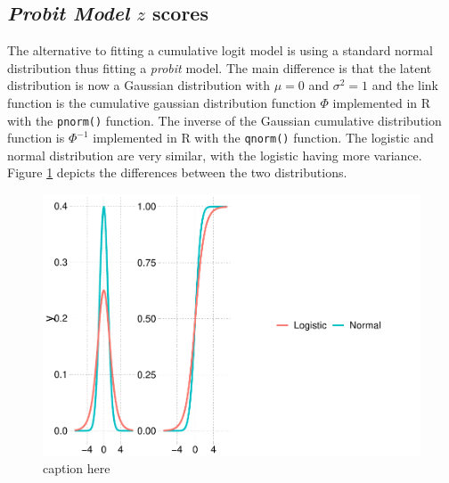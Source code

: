 \documentclass[
  man,floatsintext]{apa6}
\begin{document}
\subsection{\texorpdfstring{\emph{Probit Model} \(z\) scores}{Probit Model z scores}}\label{probit-model-z-scores}

The alternative to fitting a cumulative logit model is using a standard normal distribution thus fitting a \emph{probit} model. The main difference is that the latent distribution is now a Gaussian distribution with \(\mu = 0\) and \(\sigma^2 = 1\) and the link function is the cumulative gaussian distribution function \(\Phi\) implemented in R with the \texttt{pnorm()} function. The inverse of the Gaussian cumulative distribution function is \(\Phi^{-1}\) implemented in R with the \texttt{qnorm()} function. The logistic and normal distribution are very similar, with the logistic having more variance. Figure \ref{fig:fig-logit-vs-probit} depicts the differences between the two distributions.

\scriptsize

\begin{figure}

{\centering \includegraphics{paper-new_files/figure-latex/fig-logit-vs-probit-1} 

}

\caption{caption here}\label{fig:fig-logit-vs-probit}
\end{figure}

\normalsize
\end{document}
